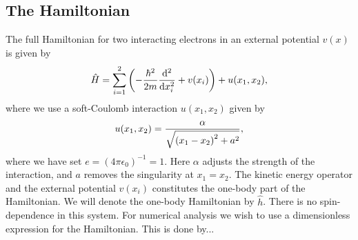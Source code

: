\documentclass[twocolumn,superscriptaddress,unsortedaddress,
 amsmath,amssymb,
 aps,
]{revtex4-2}
\begin{document}
    \subsection{The Hamiltonian}
        The full Hamiltonian for two interacting electrons in an external
        potential $v(x)$ is given by
        \begin{align}
            \hat{H}
            = \sum_{i = 1}^{2}\qty(
                -\frac{\hbar^2}{2m}\dv[2]{}{x_i}
                + v(x_i)
            )
            + u(x_1, x_2),
        \end{align}
        where we use a soft-Coulomb interaction $u(x_1, x_2)$ given by
        \begin{align}
            u(x_1, x_2)
            =
            \frac{\alpha}{\sqrt{\qty(x_1 - x_2)^2 + a^2}},
        \end{align}
        where we have set $e = (4 \pi \epsilon_0)^{-1} = 1$.
        Here $\alpha$ adjusts the strength of the interaction, and $a$ removes
        the singularity at $x_1 = x_2$.
        The kinetic energy operator and the external potential $v(x_i)$ constitutes
        the one-body part of the Hamiltonian.
        We will denote the one-body Hamiltonian by $\hat{h}$.
        There is no spin-dependence in this system.
        For numerical analysis we wish to use a dimensionless expression for the
        Hamiltonian.
        This is done by...
\end{document}
